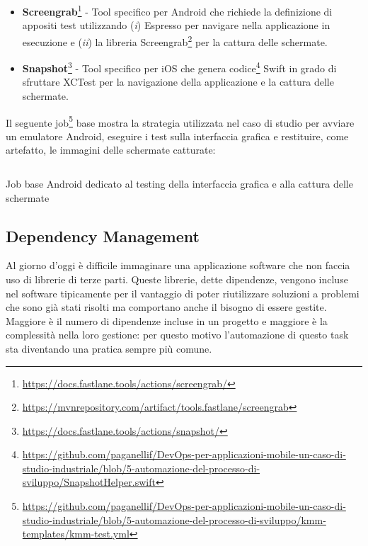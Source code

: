 \begin{itemize}
    \item \textbf{Screengrab}\footnote{\href{https://docs.fastlane.tools/actions/screengrab/}{https://docs.fastlane.tools/actions/screengrab/}} - Tool specifico per Android che richiede la definizione di appositi test utilizzando (\textit{i}) Espresso per navigare nella applicazione in esecuzione e (\textit{ii}) la libreria Screengrab\footnote{\href{https://mvnrepository.com/artifact/tools.fastlane/screengrab}{https://mvnrepository.com/artifact/tools.fastlane/screengrab}} per la cattura delle schermate.
    \item \textbf{Snapshot}\footnote{\href{https://docs.fastlane.tools/actions/snapshot/}{https://docs.fastlane.tools/actions/snapshot/}} - Tool specifico per iOS che genera codice\footnote{\href{https://github.com/paganellif/DevOps-per-applicazioni-mobile-un-caso-di-studio-industriale/blob/5-automazione-del-processo-di-sviluppo/SnapshotHelper.swift}{https://github.com/paganellif/DevOps-per-applicazioni-mobile-un-caso-di-studio-industriale/blob/5-automazione-del-processo-di-sviluppo/SnapshotHelper.swift}} Swift in grado di sfruttare XCTest per la navigazione della applicazione e la cattura delle schermate.
\end{itemize}

Il seguente job\footnote{\href{https://github.com/paganellif/DevOps-per-applicazioni-mobile-un-caso-di-studio-industriale/blob/5-automazione-del-processo-di-sviluppo/kmm-templates/kmm-test.yml}{https://github.com/paganellif/DevOps-per-applicazioni-mobile-un-caso-di-studio-industriale/blob/5-automazione-del-processo-di-sviluppo/kmm-templates/kmm-test.yml}} base mostra la strategia utilizzata nel caso di studio per avviare un emulatore Android, eseguire i test sulla interfaccia grafica e restituire, come artefatto, le immagini delle schermate catturate:
\begin{listing}[H]
    \inputminted{yaml}{code/base-ui-test-android.yaml}
    \caption{Job base Android dedicato al testing della interfaccia grafica e alla cattura delle schermate}
\end{listing}

\subsection{Dependency Management}
Al giorno d'oggi è difficile immaginare una applicazione software che non faccia uso di librerie di terze parti. Queste librerie, dette dipendenze, vengono incluse nel software tipicamente per il vantaggio di poter riutilizzare soluzioni a problemi che sono già stati risolti ma comportano anche il bisogno di essere gestite. Maggiore è il numero di dipendenze incluse in un progetto e maggiore è la complessità nella loro gestione: per questo motivo l’automazione di questo task sta diventando una pratica sempre più comune.

